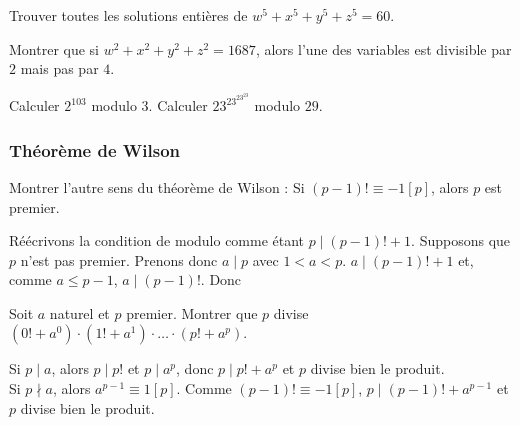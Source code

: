 \begin{exo}
Trouver toutes les solutions entières de $w^5 + x^5 + y^5 + z^5 = 60$.
\end{exo}

\begin{exo}
Montrer que si $w^2 + x^2 + y^2 + z^2 = 1687$, alors l'une des variables est divisible par $2$ mais pas par $4$.
\end{exo}

\begin{exo}
Calculer $2^{103}$ modulo $3$. Calculer $23^{23^{23^{23}}}$ modulo $29$.
\end{exo}

\subsubsection{Théorème de Wilson}

\begin{exo}
Montrer l'autre sens du théorème de Wilson : Si $(p-1)! \equiv -1 [p]$, alors $p$ est premier.
\end{exo}
\begin{sol}
Réécrivons la condition de modulo comme étant $p\mid (p-1)! + 1$.
Supposons que $p$ n'est pas premier. Prenons donc $a\mid p$ avec $ 1 < a < p $. $a\mid (p-1)!+1$ et, comme $a\le p - 1$, $a\mid (p - 1)!$. Donc
\end{sol}

\begin{exo}
Soit $a$ naturel et $p$ premier. Montrer que $p$ divise $ (0! + a^0) \cdot (1! + a^1) \cdot \dots \cdot (p! + a^p) $.
\end{exo}
\begin{sol}
Si $p\mid a$, alors $p\mid p!$ et $p\mid a^p$, donc $p\mid p! + a^p$ et $p$ divise bien le produit. \\

Si $p\nmid a$, alors $a^{p-1}\equiv 1 [p]$. Comme $(p-1)!\equiv -1 [p]$, $p\mid (p-1)! + a^{p-1}$ et $p$ divise bien le produit.
\end{sol}